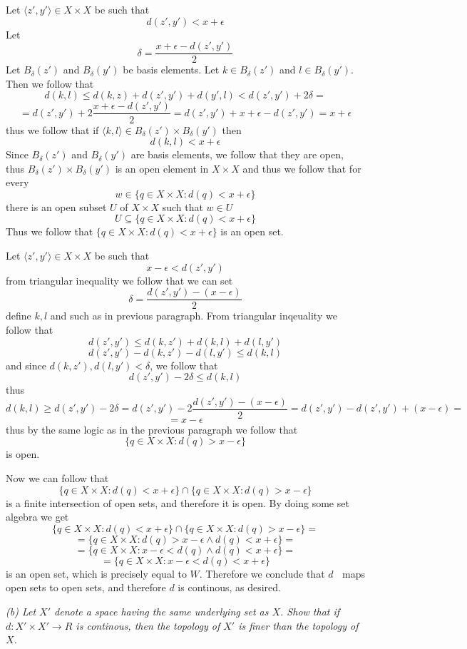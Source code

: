 \documentclass[11pt,oneside,titlepage]{book}
\DeclareMathOperator \inv {^{-1}}
\newcommand{\eangle}[1]{\langle #1 \rangle}
\newcommand{\set}[1]{\{ #1 \}}
\begin{document}
Let $\eangle{z', y'} \in X \times X$ be such that
$$d(z', y') < x + \epsilon$$
Let
$$\delta = \frac{x + \epsilon - d(z', y')}{2}$$
Let $B_\delta(z')$ and $B_\delta(y')$ be basis elements. Let $k \in B_\delta(z')$
and $l \in B_\delta(y')$. Then we follow that
$$d(k, l) \leq d(k, z) + d(z', y') + d(y', l) < d(z', y') + 2 \delta = $$
$$ = 
d(z', y') + 2 \frac{x + \epsilon - d(z', y')}{2} = d(z', y') + x + \epsilon - d(z', y') =
x + \epsilon $$
thus we follow that if $\eangle{k, l} \in B_\delta(z') \times B_\delta(y')$ then 
$$d(k, l) < x + \epsilon $$
Since $B_\delta(z')$ and $B_\delta(y')$ are basis elements, we follow that they are open,
thus $B_\delta(z') \times B_\delta(y')$ is an open element in $X \times X$ and thus we follow that
for every
$$w \in \set{q \in X \times X: d(q) < x + \epsilon}$$
there is an open subset $U$  of $X \times X$ such that $w \in U$
$$U \subseteq \set{q \in X \times X: d(q) < x + \epsilon}$$
Thus we follow that $\set{q \in X \times X: d(q) < x + \epsilon}$ is an open set.

Let $\eangle{z', y'} \in X \times X$ be such that
$$x - \epsilon < d(z', y')$$
from triangular inequality we follow that
we can set 
$$\delta = \frac{d(z', y') - (x - \epsilon)}{2}$$
define $k, l$ and such as in previous paragraph. From triangular inqeuality we follow that 
$$d(z', y') \leq d(k, z') + d(k, l) + d(l, y')$$
$$d(z', y') - d(k, z') - d(l, y') \leq d(k, l)$$
and since $d(k, z'), d(l, y') < \delta$, we follow that
$$d(z', y') - 2\delta \leq d(k, l)$$
thus
$$d(k, l) \geq d(z', y') - 2\delta =  d(z', y') - 2 \frac{d(z', y') - (x - \epsilon)}{2} =
d(z', y') - d(z', y') + (x - \epsilon) =  $$
$$ = x - \epsilon $$
thus by the same logic as in the previous paragraph we follow that 
$$\set{q \in X \times X: d(q) > x - \epsilon}$$
is open.

Now we can follow that
$$\set{q \in X \times X: d(q) < x + \epsilon} \cap \set{q \in X \times X: d(q) > x - \epsilon}$$
is a finite intersection of open sets, and therefore it is open. By doing some set algebra
we get
$$\set{q \in X \times X: d(q) < x + \epsilon} \cap \set{q \in X \times X: d(q) > x - \epsilon} =$$
$$ = \set{q \in X \times X:  d(q) > x - \epsilon \land d(q) < x + \epsilon } = $$
$$ = \set{q \in X \times X:  x - \epsilon < d(q) \land d(q) < x + \epsilon } = $$
$$ = \set{q \in X \times X:  x - \epsilon < d(q) < x + \epsilon }$$
is an open set, which is precisely equal to $W$. Therefore we conclude that $d\inv$
maps open sets to open sets, and therefore $d$ is continous, as desired.

\textit{(b) Let $X'$ denote a space having the same underlying set as $X$. Show that if
  $d: X' \times X' \to R$ is continous, then the topology of $X'$ is finer than the topology
  of $X$.}
\end{document}
